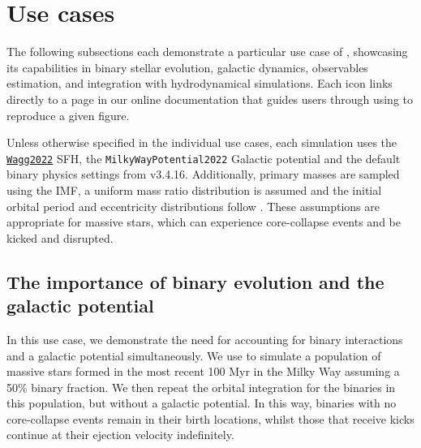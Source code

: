 \documentclass[twocolumn, twocolappendix, oneside, linenumbers]{aastex631}
\newcommand{\codeLink}[2]{{\href{https://cogsworth.readthedocs.io/en/latest/api/cogsworth.#2.#1.html}{\color{codecolour} \texttt{#1}}}}
\newcommand{\tutorialIcon}{{\color{codecolour}{\faLaptopCode}}}
\begin{document}
\section{Use cases}\label{sec:use_cases}

The following subsections each demonstrate a particular use case of \cogsworth, showcasing its capabilities in binary stellar evolution, galactic dynamics, observables estimation, and integration with hydrodynamical simulations. Each \tutorialIcon{} icon links directly to a page in our online documentation that guides users through using \cogsworth to reproduce a given figure.

Unless otherwise specified in the individual use cases, each \cogsworth simulation uses the \codeLink{Wagg2022}{sfh} SFH, the \texttt{MilkyWayPotential2022} Galactic potential and the default binary physics settings from \cosmic v3.4.16. Additionally, primary masses are sampled using the \citet{Kroupa+2001:2001MNRAS.322..231K} IMF, a uniform mass ratio distribution is assumed and the initial orbital period and eccentricity distributions follow \citet{Sana+2012}. These assumptions are appropriate for massive stars, which can experience core-collapse events and be kicked and disrupted.

\subsection{The importance of binary evolution and the galactic potential}\label{sec:binaries_and_pot_use_case}

In this use case, we demonstrate the need for accounting for binary interactions and a galactic potential simultaneously. We use \cogsworth to simulate a population of massive stars formed in the most recent 100 Myr in the Milky Way assuming a 50\% binary fraction. We then repeat the orbital integration for the binaries in this population, but without a galactic potential. In this way, binaries with no core-collapse events remain in their birth locations, whilst those that receive kicks continue at their ejection velocity indefinitely.
\end{document}
